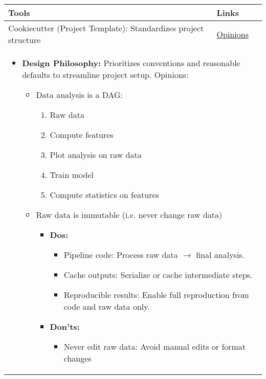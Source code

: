 \begin{summary}
    \begin{center}
        \begin{tabular}{ll}
            \toprule
            \textbf{Tools} & \textbf{Links} \\
            \toprule
            Cookiecutter (Project Template): Standardizes project structure & \href{https://cookiecutter-data-science.drivendata.org/opinions/}{Opinions} \\
            \multicolumn{2}{p{\linewidth}}{
            \begin{itemize}
                \item \textbf{Design Philosophy:} Prioritizes conventions and reasonable defaults to streamline project setup. Opinions:
                \begin{itemize}
                    \item Data analysis is a DAG:
                    \begin{enumerate}
                        \item Raw data
                        \item Compute features
                        \item Plot analysis on raw data 
                        \item Train model
                        \item Compute statistics on features
                    \end{enumerate}
                    \item Raw data is immutable (i.e. never change raw data)
                    \begin{itemize}
                        \item \textbf{Dos:}
                        \begin{itemize}
                            \item Pipeline code: Process raw data $\rightarrow$ final analysis.
                            \item Cache outputs: Serialize or cache intermediate steps. 
                            \item Reproducible results: Enable full reproduction from code and raw data only.
                        \end{itemize}
                        \item \textbf{Don'ts:}
                        \begin{itemize}
                            \item Never edit raw data: Avoid manual edits or format changes

\end{itemize}
\end{itemize}
\end{itemize}
\end{itemize}}
\end{tabular}
\end{center}
\end{summary}
